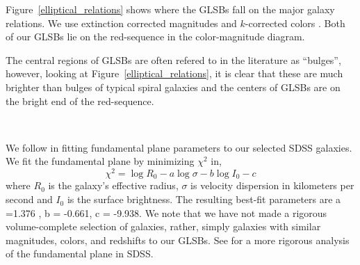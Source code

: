 \documentclass{emulateapj}
\begin{document}

Figure~\ref{elliptical_relations} shows where the GLSBs fall on the major galaxy relations.  We use extinction corrected magnitudes and $k$-corrected colors \citep{Chilingarian10}.  Both of our GLSBs lie on the red-sequence in the color-magnitude diagram.  

The central regions of GLSBs are often refered to in the literature as ``bulges'', however, looking at Figure~\ref{elliptical_relations}, it is clear that these are much brighter than bulges of typical spiral galaxies and the centers of GLSBs are on the bright end of the red-sequence.  

\begin{figure*}
\\
\caption{
Top Left:  The color-magnitude diagram for 141,000 galaxies of similar redshift and magnitude as Malin 2 and UGC 6614.  Top Right:  The Faber-Jackson relation for 45,700 SDSS galaxies, along with a best-fit line.  Left:  The $r$-band fundamental plane from SDSS along with our GLSB galaxies and best-fit line.  Bottom Right:  The relation between central velocity dispersion and the Mg2 absorption feature.   Looking at the SDSS data, our GLSB galaxies appear as relatively typical red elliptical galaxies.  \label{elliptical_relations}}
\end{figure*}

We follow \citet{Bernardi03,Bernardi03b} in fitting fundamental plane parameters to our selected SDSS galaxies.  We fit the fundamental plane by minimizing $\chi^2$ in, 
\begin{equation}
\chi^2 = \log R_0 - a \log \sigma - b \log I_0 - c
\end{equation}
where $R_0$ is the galaxy's effective radius, $\sigma$ is velocity dispersion in kilometers per second and $I_0$ is the surface brightness.  The resulting best-fit parameters are  a =1.376 , b = -0.661, c = -9.938.  We note that we have not made a rigorous volume-complete selection of galaxies, rather, simply galaxies with similar magnitudes, colors, and redshifts to our GLSBs.   See \citet{Saulder13} for a more rigorous analysis of the fundamental plane in SDSS. 
\end{document}
